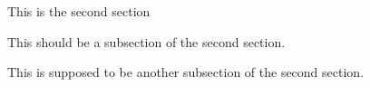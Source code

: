 
This is the second section


This should be a subsection of the second section.


This is supposed to be another subsection of the second section.
